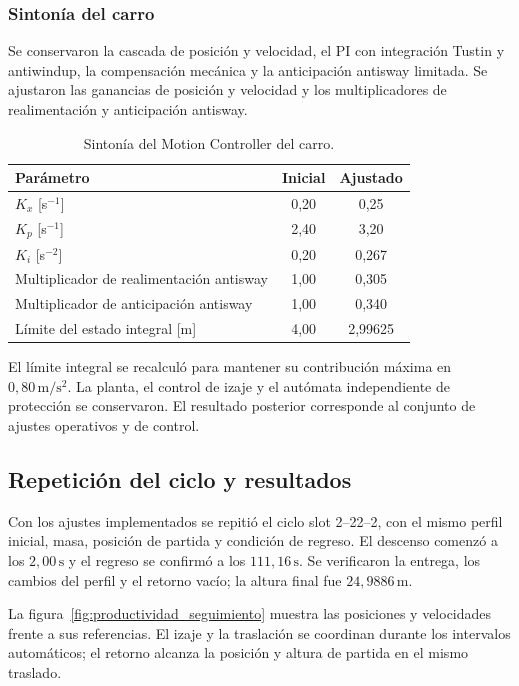 \documentclass[a4paper,10pt,onecolumn,journal]{ieeeconf}
\numberwithin{equation}{section}
\newcommand{\un}[1]{\,\mathrm{#1}}
\begin{document}
\subsubsection{Sintonía del carro}

Se conservaron la cascada de posición y velocidad, el PI con integración Tustin y antiwindup, la compensación mecánica y la anticipación antisway limitada. Se ajustaron las ganancias de posición y velocidad y los multiplicadores de realimentación y anticipación antisway.

\begin{table}[H]\centering\small
\caption{Sintonía del Motion Controller del carro.}
\label{tab:sintonia_productividad}
\begin{tabularx}{\linewidth}{@{}Ycc@{}}\toprule
Parámetro & Inicial & Ajustado\\\midrule
$K_x$ [s$^{-1}$] & 0,20 & 0,25\\
$K_p$ [s$^{-1}$] & 2,40 & 3,20\\
$K_i$ [s$^{-2}$] & 0,20 & 0,267\\
Multiplicador de realimentación antisway & 1,00 & 0,305\\
Multiplicador de anticipación antisway & 1,00 & 0,340\\
Límite del estado integral [m] & 4,00 & 2,99625\\\bottomrule
\end{tabularx}
\end{table}

El límite integral se recalculó para mantener su contribución máxima
en $0{,}80\un{m/s^2}$. La planta, el control de izaje y el autómata
independiente de protección se conservaron. El resultado posterior
corresponde al conjunto de ajustes operativos y de control.

\subsection{Repetición del ciclo y resultados}

Con los ajustes implementados se repitió el ciclo slot 2--22--2,
con el mismo perfil inicial, masa, posición de partida y condición
de regreso. El descenso comenzó a los $2{,}00\un{s}$ y el regreso
se confirmó a los $111{,}16\un{s}$. Se verificaron la entrega,
los cambios del perfil y el retorno vacío; la altura final fue
$24{,}9886\un{m}$.

La figura~\ref{fig:productividad_seguimiento} muestra las posiciones
y velocidades frente a sus referencias. El izaje y la traslación
se coordinan durante los intervalos automáticos; el retorno alcanza
la posición y altura de partida en el mismo traslado.
\end{document}
